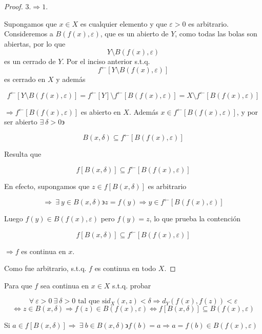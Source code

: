 \begin{proof}
    $3. \Rightarrow 1.$

    Supongamos que $x \in X$ es cualquier elemento y que $\varepsilon > 0$ es arbitrario. Consideremos a $B(f(x), \varepsilon)$, que es un abierto de $Y$, como todas las bolas son abiertas, por lo que $$Y \setminus B(f(x), \varepsilon)$$ es un cerrado de $Y$. Por el inciso anterior s.t.q. $$ {f}^{\leftarrow}[Y \setminus B(f(x), \varepsilon)] $$ es cerrado en $X$ y además

    $$ {f}^{\leftarrow}[Y \setminus B(f(x), \varepsilon)] = {f}^{\leftarrow}[Y]  \setminus {f}^{\leftarrow}[ B(f(x), \varepsilon)]  = X \setminus {f}^{\leftarrow}[ B(f(x), \varepsilon)]$$

    $\Rightarrow {f}^{\leftarrow}[ B(f(x), \varepsilon)]$ es abierto en $X$. Además $x \in  {f}^{\leftarrow}[ B(f(x), \varepsilon)]$, y por ser abierto $\exists \: \delta > 0 \backepsilon$

    $$ B(x,\delta) \subseteq {f}^{\leftarrow}[ B(f(x), \varepsilon)]$$

    Resulta que

    $$ f[B(x,\delta)] \subseteq {f}^{\leftarrow}[ B(f(x), \varepsilon)]$$

    En efecto, supongamos que $z \in f[B(x,\delta)] $ es arbitrario

    $$\Rightarrow \: \exists \: y \in B(x,\delta) \backepsilon z=f(y) \Rightarrow y \in {f}^{\leftarrow}[ B(f(x), \varepsilon)]$$

    Luego $f(y) \in B(f(x), \varepsilon)$ pero $f(y)=z$, lo que prueba la contención 
    
    $$f[B(x,\delta)] \subseteq {f}^{\leftarrow}[ B(f(x), \varepsilon)] $$ 
    
   $\Rightarrow f$ es continua en $x$. 
    
    Como fue arbitrario, s.t.q. $f$ es continua en todo $X$.
\end{proof}

\begin{remark}
    Para que $f$ sea continua en $x \in X$ s.t.q. probar 

    $$\forall \: \varepsilon >0 \: \exists \: \delta >0 \text{ tal que si} d_X(x,z) < \delta \Rightarrow d_Y(f(x),f(z)) < \varepsilon$$
    $$\Leftrightarrow z \in B(x,\delta) \Rightarrow f(z) \in B(f(x),\varepsilon) \Leftrightarrow f[B(x,\delta)] \subseteq B(f(x),\varepsilon)$$

    Si $a \in  f[B(x,\delta)] \Rightarrow \: \exists \: b \in B(x,\delta) \backepsilon f(b) = a \Rightarrow a=f(b) \in  B(f(x),\varepsilon)$
\end{remark}

